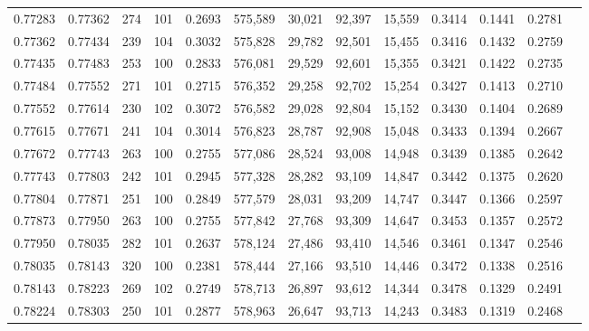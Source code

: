 \begin{tabular}{rrrrrrrrrrrrr}
0.77283 & 0.77362 &   274 & 101 &                                     0.2693 & 575,589 &  30,021 &  92,397 &  15,559 & 0.3414 & 0.1441 & 0.2781 \\
0.77362 & 0.77434 &   239 & 104 &                                     0.3032 & 575,828 &  29,782 &  92,501 &  15,455 & 0.3416 & 0.1432 & 0.2759 \\
0.77435 & 0.77483 &   253 & 100 &                                     0.2833 & 576,081 &  29,529 &  92,601 &  15,355 & 0.3421 & 0.1422 & 0.2735 \\
0.77484 & 0.77552 &   271 & 101 &                                     0.2715 & 576,352 &  29,258 &  92,702 &  15,254 & 0.3427 & 0.1413 & 0.2710 \\
0.77552 & 0.77614 &   230 & 102 &                                     0.3072 & 576,582 &  29,028 &  92,804 &  15,152 & 0.3430 & 0.1404 & 0.2689 \\
0.77615 & 0.77671 &   241 & 104 &                                     0.3014 & 576,823 &  28,787 &  92,908 &  15,048 & 0.3433 & 0.1394 & 0.2667 \\
0.77672 & 0.77743 &   263 & 100 &                                     0.2755 & 577,086 &  28,524 &  93,008 &  14,948 & 0.3439 & 0.1385 & 0.2642 \\
0.77743 & 0.77803 &   242 & 101 &                                     0.2945 & 577,328 &  28,282 &  93,109 &  14,847 & 0.3442 & 0.1375 & 0.2620 \\
0.77804 & 0.77871 &   251 & 100 &                                     0.2849 & 577,579 &  28,031 &  93,209 &  14,747 & 0.3447 & 0.1366 & 0.2597 \\
0.77873 & 0.77950 &   263 & 100 &                                     0.2755 & 577,842 &  27,768 &  93,309 &  14,647 & 0.3453 & 0.1357 & 0.2572 \\
0.77950 & 0.78035 &   282 & 101 &                                     0.2637 & 578,124 &  27,486 &  93,410 &  14,546 & 0.3461 & 0.1347 & 0.2546 \\
0.78035 & 0.78143 &   320 & 100 &                                     0.2381 & 578,444 &  27,166 &  93,510 &  14,446 & 0.3472 & 0.1338 & 0.2516 \\
0.78143 & 0.78223 &   269 & 102 &                                     0.2749 & 578,713 &  26,897 &  93,612 &  14,344 & 0.3478 & 0.1329 & 0.2491 \\
0.78224 & 0.78303 &   250 & 101 &                                     0.2877 & 578,963 &  26,647 &  93,713 &  14,243 & 0.3483 & 0.1319 & 0.2468 \\

\end{tabular}

